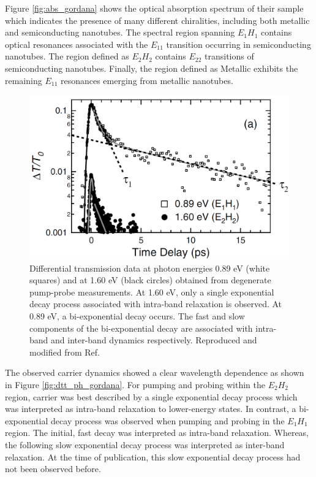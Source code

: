 Figure \ref{fig:abs_gordana} shows the optical absorption spectrum of their sample which indicates the presence of many different chiralities, including both metallic and semiconducting nanotubes. The spectral region spanning $E_{1} H_{1}$ contains optical resonances associated with the $E_{11}$ transition occurring in semiconducting nanotubes. The region defined as $E_{2} H_{2}$ contains $E_{22}$ transitions of semiconducting nanotubes. Finally, the region defined as Metallic exhibits the remaining $E_{11}$ resonances emerging from metallic nanotubes.

\begin{figure}[ht]
	\centering
	\includegraphics[scale=0.3]{images/chapter_prior_works/dtt_gordana}
	\caption{Differential transmission data at photon energies 0.89 eV (white squares) and at 1.60 eV (black circles) obtained from degenerate pump-probe measurements. At 1.60 eV, only a single exponential decay process associated with intra-band relaxation is observed. At 0.89 eV, a bi-exponential decay occurs. The fast and slow components of the bi-exponential decay are associated with intra-band and inter-band dynamics respectively. Reproduced and modified from Ref.\ \cite{ostojic2004interband}}
	\label{fig: abs_gordana}
\end{figure}

The observed carrier dynamics showed a clear wavelength dependence as shown in Figure \ref{fig:dtt_ph_gordana}. For pumping and probing within the $E_2 H_2$ region, carrier was best described by a single exponential decay process which was interpreted as intra-band relaxation to lower-energy states. In contrast, a bi-exponential decay process was observed when pumping and probing in the $E_1 H_1$ region. The initial, fast decay was interpreted as intra-band relaxation. Whereas, the following slow exponential decay process was interpreted as inter-band relaxation. At the time of publication, this slow exponential decay process had not been observed before.

